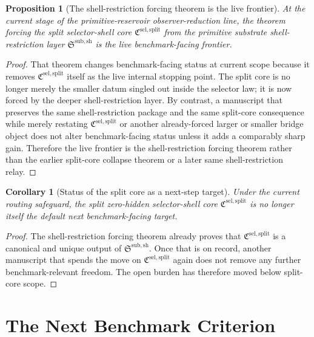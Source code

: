 \documentclass[11pt]{article}
\newcommand{\SelectorCore}{\mathfrak C^{\mathrm{sel,split}}}
\newcommand{\ShellRestriction}{\mathfrak S^{\mathrm{sub,sh}}}
\newtheorem{proposition}{Proposition}
\newtheorem{corollary}{Corollary}
\begin{document}
\begin{proposition}[The shell-restriction forcing theorem is the live frontier]
At the current stage of the primitive-reservoir observer-reduction line, the theorem forcing the split selector-shell core \(\SelectorCore\) from the primitive substrate shell-restriction layer \(\ShellRestriction\) is the live benchmark-facing frontier.
\end{proposition}

\begin{proof}
That theorem changes benchmark-facing status at current scope because it removes \(\SelectorCore\) itself as the live internal stopping point. The split core is no longer merely the smaller datum singled out inside the selector law; it is now forced by the deeper shell-restriction layer. By contrast, a manuscript that preserves the same shell-restriction package and the same split-core consequence while merely restating \(\SelectorCore\) or another already-forced larger or smaller bridge object does not alter benchmark-facing status unless it adds a comparably sharp gain. Therefore the live frontier is the shell-restriction forcing theorem rather than the earlier split-core collapse theorem or a later same shell-restriction relay.
\end{proof}

\begin{corollary}[Status of the split core as a next-step target]
Under the current routing safeguard, the split zero-hidden selector-shell core \(\SelectorCore\) is no longer itself the default next benchmark-facing target.
\end{corollary}

\begin{proof}
The shell-restriction forcing theorem already proves that \(\SelectorCore\) is a canonical and unique output of \(\ShellRestriction\). Once that is on record, another manuscript that spends the move on \(\SelectorCore\) again does not remove any further benchmark-relevant freedom. The open burden has therefore moved below split-core scope.
\end{proof}

\section{The Next Benchmark Criterion}
\end{document}
